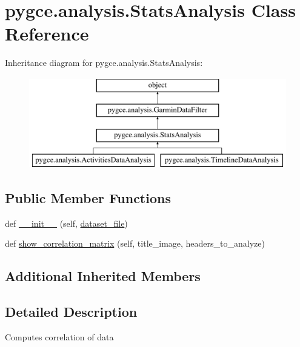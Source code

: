 \hypertarget{classpygce_1_1analysis_1_1_stats_analysis}{}\section{pygce.\+analysis.\+Stats\+Analysis Class Reference}
\label{classpygce_1_1analysis_1_1_stats_analysis}
Inheritance diagram for pygce.\+analysis.\+Stats\+Analysis\+:\begin{figure}[H]
\begin{center}
\leavevmode
\includegraphics[height=4.000000cm]{classpygce_1_1analysis_1_1_stats_analysis}
\end{center}
\end{figure}
\subsection*{Public Member Functions}
\begin{DoxyCompactItemize}
\item 
def \hyperlink{classpygce_1_1analysis_1_1_stats_analysis_a2a086018c23d13d64651fdc6ba0b41ae}{\+\_\+\+\_\+init\+\_\+\+\_\+} (self, \hyperlink{classpygce_1_1analysis_1_1_garmin_data_filter_a1d609bdd447d36bafce41e43586540ef}{dataset\+\_\+file})
\item 
def \hyperlink{classpygce_1_1analysis_1_1_stats_analysis_a174d6c1f91b2818a41db03dafdce964c}{show\+\_\+correlation\+\_\+matrix} (self, title\+\_\+image, headers\+\_\+to\+\_\+analyze)
\end{DoxyCompactItemize}
\subsection*{Additional Inherited Members}


\subsection{Detailed Description}
\begin{DoxyVerb}Computes correlation of data\end{DoxyVerb}
 


